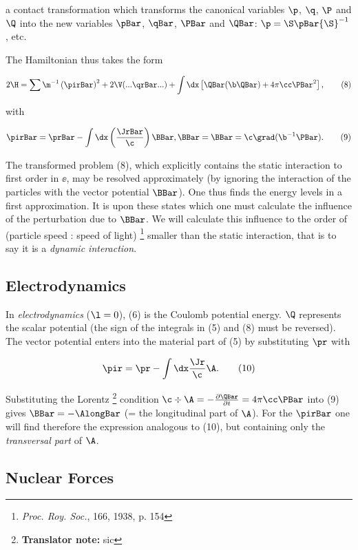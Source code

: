 \documentclass{article}
\newcommand{\tn}[1]{\footnote{\textbf{Translator note:} #1}}
\newcommand{\inv}[1]{{#1}^{-1}}
\newcommand{\pdXdY}[2]{
\frac{\partial {#1}}{\partial {#2}}
}
\renewcommand{\it}[1]{\textit{#1}}
\newcommand{\nequ}[2]{
\begin{equation*}
#1
\tag{#2}
\end{equation*}
}
\begin{document}
a contact transformation which transforms the canonical variables $\p$, $\q$, $\P$ and $\Q$ into the new variables $\pBar$, $\qBar$, $\PBar$ and $\QBar$: $\p = \S\pBar\inv{\S}$, etc.

The Hamiltonian thus takes the form
\nequ{
2\H = \sum\inv{\m}\left( \pirBar \right)^2 + 2\V(...\qrBar...) + \int\dx\left[ \QBar(\b\QBar) + 4\pi\cc\PBar^2\right],
}{8}

with

\nequ{
\pirBar = \prBar - \int\dx\left( \frac{\JrBar}{\c} \right) \BBar, \BBar = \BBar = \c\grad(\inv{\b}\PBar).
}{9}

The transformed problem (8), which explicitly contains the static interaction to first order in $\ee$, may be resolved approximately (by ignoring the interaction of the particles with the vector potential $\BBar$). One thus finds the energy levels in a first approximation. It is upon these states which one must calculate the influence of the perturbation due to $\BBar$. We will calculate this influence to the order of (particle speed : speed of light) \footnote{\it{Proc. Roy. Soc.}, 166, 1938, p. 154} smaller than the static interaction, that is to say it is a \it{dynamic interaction}.

\subsection{Electrodynamics}

In \it{electrodynamics} ($\l = 0$), (6) is the Coulomb potential energy. $\Q$ represents the scalar potential (the sign of the integrals in (5) and (8) must be reversed). The vector potential enters into the material part of (5) by substituting $\pr$ with

\nequ{
\pir = \pr - \int\dx\frac{\Jr}{\c}\A.
}{10}

Substituting the Lorentz \tn{sic} condition $\c\div\A = -\pdXdY{\QBar}{t} = 4\pi\cc\PBar$ into (9) gives $\BBar = -\AlongBar$ (= the longitudinal part of $\A$). For the $\pirBar$ one will find therefore the expression analogous to (10), but containing only the \it{transversal part} of $\A$.

\subsection[b]{Nuclear Forces}
\end{document}
